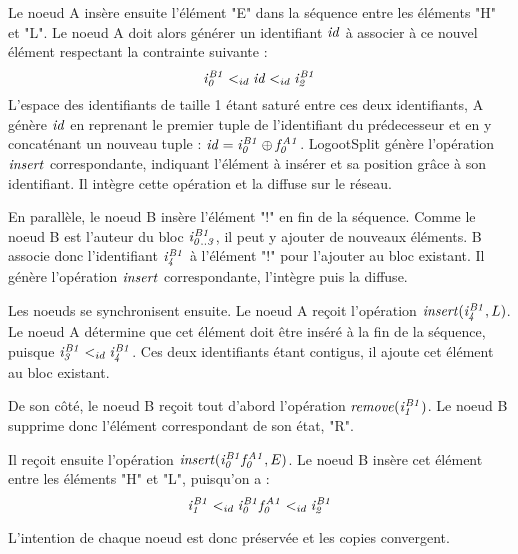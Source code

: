 Le noeud A insère ensuite l'élément "E" dans la séquence entre les éléments "H" et "L".
Le noeud A doit alors générer un identifiant $\mathit{id}$ à associer à ce nouvel élément respectant la contrainte suivante :
\begin{equation*}
  \mathit{i}^{\mathit{B1}}_{\mathit{0}} <_{id} \mathit{id} <_{id} \mathit{i}^{\mathit{B1}}_{\mathit{2}}
\end{equation*}
L'espace des identifiants de taille 1 étant saturé entre ces deux identifiants, A génère $\mathit{id}$ en reprenant le premier tuple de l'identifiant du prédecesseur et en y concaténant un nouveau tuple : $\mathit{id} = \mathit{i}^{\mathit{B1}}_{\mathit{0}} \oplus \mathit{f}^{\mathit{A1}}_{\mathit{0}}$.
LogootSplit génère l'opération $\mathit{insert}$ correspondante, indiquant l'élément à insérer et sa position grâce à son identifiant.
Il intègre cette opération et la diffuse sur le réseau.

En parallèle, le noeud B insère l'élément "!" en fin de la séquence.
Comme le noeud B est l'auteur du bloc $\mathit{i}^{\mathit{B1}}_{\mathit{0..3}}$, il peut y ajouter de nouveaux éléments.
B associe donc l'identifiant $\mathit{i}^{\mathit{B1}}_{\mathit{4}}$ à l'élément "!" pour l'ajouter au bloc existant.
Il génère l'opération $\mathit{insert}$ correspondante, l'intègre puis la diffuse.

Les noeuds se synchronisent ensuite.
Le noeud A reçoit l'opération $\mathit{insert}(\mathit{i}^{\mathit{B1}}_{\mathit{4}},L)$.
Le noeud A détermine que cet élément doit être inséré à la fin de la séquence, puisque $\mathit{i}^{\mathit{B1}}_{\mathit{3}} <_{id} \mathit{i}^{\mathit{B1}}_{\mathit{4}}$.
Ces deux identifiants étant contigus, il ajoute cet élément au bloc existant.

De son côté, le noeud B reçoit tout d'abord l'opération $\mathit{remove}(\mathit{i}^{\mathit{B1}}_{\mathit{1}})$.
Le noeud B supprime donc l'élément correspondant de son état, "R".

Il reçoit ensuite l'opération $\mathit{insert}(\mathit{i}^{\mathit{B1}}_{\mathit{0}}\mathit{f}^{\mathit{A1}}_{\mathit{0}},E)$.
Le noeud B insère cet élément entre les éléments "H" et "L", puisqu'on a :
\begin{equation*}
  \mathit{i}^{\mathit{B1}}_{\mathit{1}} <_{id} \mathit{i}^{\mathit{B1}}_{\mathit{0}}\mathit{f}^{\mathit{A1}}_{\mathit{0}} <_{id} \mathit{i}^{\mathit{B1}}_{\mathit{2}}
\end{equation*}

L'intention de chaque noeud est donc préservée et les copies convergent.
